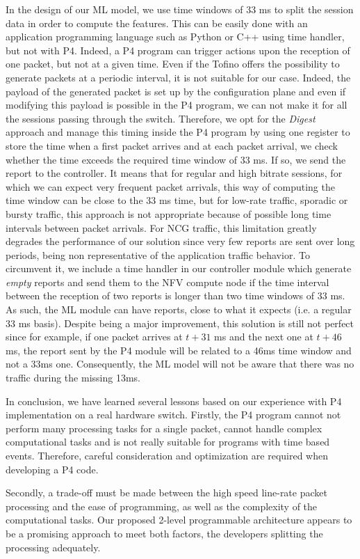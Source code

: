 In the design of our ML model, we use time windows of 33 ms to split the session data in order to compute the features. This can be easily done with an application programming language such as Python or C++ using time handler, but not with P4. Indeed, a P4 program can trigger actions upon the reception of one packet, but not at a given time. Even if the Tofino offers the possibility to generate packets at a periodic interval, it is not suitable for our case. Indeed, the payload of the generated packet is set up by the configuration plane and even if modifying this payload is possible in the P4 program, we can not make it for all the sessions passing through the switch.  Therefore, we opt for the \emph{Digest} approach and manage this timing inside the P4 program by using one register to store the time when a first packet arrives and at each packet arrival, we check whether the time exceeds the required time window  of 33 ms. If so, we send the report to the controller. It means that for regular and high bitrate sessions, for which we can expect very frequent packet arrivals, this way of computing the time window can be close to the 33 ms time, but
for low-rate traffic, sporadic or bursty traffic, this approach is not appropriate because of possible long time intervals between packet arrivals. %
For NCG traffic, this limitation greatly degrades the performance of our solution since very few reports are sent over long periods, being non representative of the application traffic  behavior. To circumvent it, we include a time handler in our controller module which generate \emph{empty} reports and send them to the NFV compute node if the time interval between the reception of two reports is longer than two time windows of 33 ms. As such, the ML module can have reports, close to what it expects (i.e. a regular 33 ms basis). Despite being a major improvement, this solution is still not perfect since for example, if one packet arrives at $t+31$ ms and the next one at $t+46$ ms, the report sent by the P4 module will be related to a 46ms time window and not a 33ms one. Consequently, the ML model will not be aware that there was no traffic during the missing 13ms.


In conclusion, we have learned several lessons based on our experience with P4 implementation on a real hardware switch. Firstly, the P4 program cannot not perform many processing tasks for a single packet, cannot handle complex computational tasks and is not really suitable for programs with time based events. Therefore, careful consideration and optimization are required when developing a P4 code.

Secondly, a trade-off must be made between the high speed line-rate packet processing and the ease of programming, as well as the complexity of the computational tasks. Our proposed  2-level programmable architecture appears to be a promising approach to meet both factors, the developers splitting the processing adequately.

